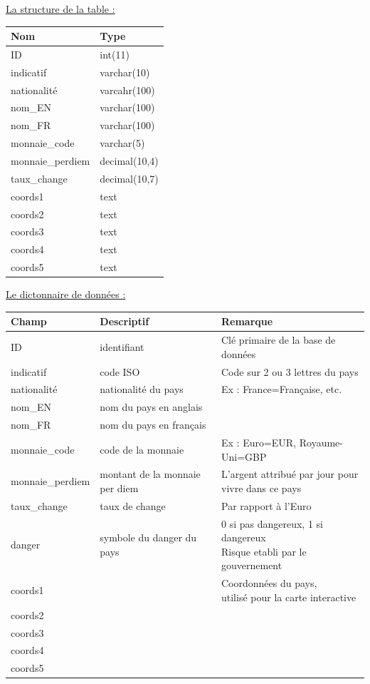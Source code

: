 \documentclass[12pt,a4paper,article]{memoir} %
\begin{document}
\underline{La structure de la table :}
\begin{center}
\begin{tabular}{|| l | l ||}
	\hline
	Nom & Type \\
	\hline \hline
	ID & int(11) \\
	\hline
	indicatif & varchar(10) \\
	\hline
	nationalité & varcahr(100) \\
	\hline
	nom\_EN & varchar(100) \\
	\hline
	nom\_FR & varchar(100) \\
	\hline
	monnaie\_code & varchar(5) \\
	\hline
	monnaie\_perdiem & decimal(10,4) \\
	\hline
	taux\_change & decimal(10,7) \\
	\hline
	coords1 & text \\
	\hline
	coords2 & text \\
	\hline
	coords3 & text \\
	\hline
	coords4 & text \\
	\hline
	coords5 & text \\
	\hline
\end{tabular}
\end{center}

\break

\underline{Le dictonnaire de données :} \break
\begin{tabular}{|| l | l | l ||}
	\hline
	Champ & Descriptif & Remarque\\
	\hline \hline
	ID & identifiant & Clé primaire de la base de données \\
	\hline
	indicatif & code ISO & Code sur 2 ou 3 lettres du pays \\
 	\hline
	nationalité & nationalité du pays &  Ex : France=Française, etc. \\
	\hline
	nom\_EN & nom du pays en anglais &  \\
	\hline
	nom\_FR & nom du pays en français &  \\
	\hline
	monnaie\_code & code de la monnaie & Ex : Euro=EUR, Royaume-Uni=GBP \\
	\hline
	 monnaie\_perdiem & montant de la monnaie per diem & \parbox{10cm}{L’argent attribué par jour pour \\ vivre dans ce pays} \\
	\hline
	 taux\_change & taux de change&  Par rapport à l’Euro\\
	\hline
	 danger & symbole du danger du pays  & \parbox{10cm}{ 0 si pas dangereux, 1 si dangereux  \\ Risque etabli par le gouvernement} \\
	\hline
	 coords1 & & \parbox{10cm}{Coordonnées du pays, \\ utilisé pour la carte interactive}\\
	\hline
	 coords2 & & \\
	\hline
	 coords3 & & \\
	\hline
	coords4 & &  \\
	\hline
	coords5 & & \\
	\hline
\end{tabular}
\break \break
\end{document}
